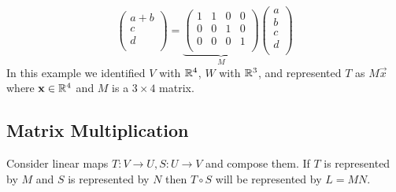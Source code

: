 \documentclass[../main.tex]{subfiles}
\begin{document}
\begin{example}
\[\begin{pmatrix}
    a + b \\
    c \\
    d \\
    \end{pmatrix} =
    \underbrace{
    \begin{pmatrix}
      1 & 1 & 0 & 0 \\
      0 & 0 & 1 & 0 \\
      0 & 0 & 0 & 1 \\
    \end{pmatrix}}_{M}
    \begin{pmatrix}
    a \\
    b \\
    c \\
    d\\
    \end{pmatrix}
  \]
  In this example we identified $V$ with $\mathbb{R}^{4}$, $W$ with $\mathbb{R}^{3}$, and represented $T$ as $M\vec{x}$ where $\boldsymbol{\mathbf{x}} \in \mathbb{R}^4$ and $M$ is a $3\times4$ matrix.
\end{example}
\subsection{Matrix Multiplication}
Consider linear maps $T: V \to U, S: U \to V$ and compose them.
If $T$ is represented by $M$ and $S$ is represented by $N$ then $T \circ S$ will be represented by $L = MN$.
\end{document}
